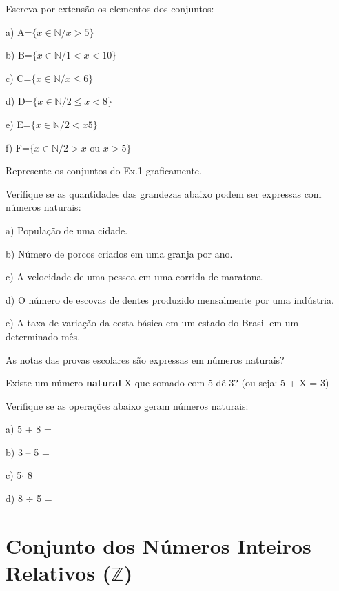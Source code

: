 \begin{exercicios}
    \exitem{} Escreva por extensão os elementos dos conjuntos:
    \begin{multicols}{2}
        a) A=$ \{x \in \mathbb{N} / x > 5 \}$ 

        b) B=$ \{ x \in \mathbb{N} / 1 < x < 10 \}$ 

        c) C=$ \{ x \in \mathbb{N} / x \leq 6 \} $
        
        d) D=$ \{ x \in \mathbb{N} / 2 \leq x < 8 \} $
        
        e) E=$ \{x \in \mathbb{N} / 2 < x  5 \}$
        
        f) F=$ \{x \in \mathbb{N} / 2 > x \textrm{ ou } x > 5 \}$
    \end{multicols}
	\exitem{} Represente os conjuntos do Ex.1 graficamente.

	\exitem{} Verifique se as quantidades das grandezas abaixo podem ser expressas com números naturais:

        a) População de uma cidade.

        b) Número de porcos criados em uma granja por ano.

        c) A velocidade de uma pessoa em uma corrida de maratona.

        d) O número de escovas de dentes produzido mensalmente por uma indústria.

        e) A taxa de variação da cesta básica em um estado do Brasil em um determinado mês.

	\exitem{} As notas das provas escolares são expressas em números naturais?

	\exitem{} Existe um número \textbf{natural} X que somado com 5 dê 3? (ou seja: 5 + X = 3)

	\exitem{} Verifique se as operações abaixo geram números naturais:
    \begin{multicols}{2}
        a) 5 + 8 = 

        b) 3 – 5 =
        
        c) 5$\cdot$ 8
        
        d) 8 $\div$ 5 =
    \end{multicols}
\end{exercicios}

\section{Conjunto dos Números Inteiros Relativos ($\mathbb{Z}$)}

